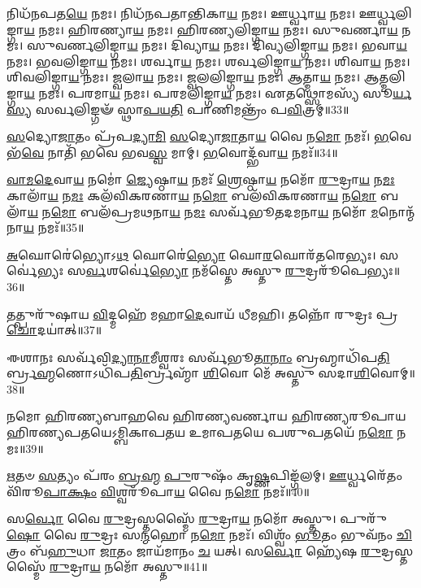𑌨𑌿𑌧᳴𑌨𑌪𑌤\-\ul{𑌯𑍇} 𑌨𑌮𑌃। 
𑌨𑌿𑌧᳴𑌨𑌪𑌤𑌾𑌨𑍍𑌤𑌿𑌕𑌾\-\ul{𑌯} 𑌨𑌮𑌃। 
𑌊𑌰𑍍𑌧𑍍𑌵𑌾\-\ul{𑌯} 𑌨𑌮𑌃। 
𑌊𑌰𑍍𑌧𑍍𑌵𑌲𑌿𑌙𑍍𑌗𑌾\-\ul{𑌯} 𑌨𑌮𑌃। 
𑌹𑌿𑌰𑌣𑍍𑌯𑌾\-\ul{𑌯} 𑌨𑌮𑌃। 
𑌹𑌿𑌰𑌣𑍍𑌯𑌲𑌿𑌙𑍍𑌗𑌾\-\ul{𑌯} 𑌨𑌮𑌃। 
𑌸𑍁𑌵𑌰𑍍𑌣𑌾\-\ul{𑌯} 𑌨𑌮𑌃। 
𑌸𑍁𑌵𑌰𑍍𑌣𑌲𑌿𑌙𑍍𑌗𑌾\-\ul{𑌯} 𑌨𑌮𑌃। 
𑌦𑌿𑌵𑍍𑌯𑌾\-\ul{𑌯} 𑌨𑌮𑌃। 
𑌦𑌿𑌵𑍍𑌯𑌲𑌿𑌙𑍍𑌗𑌾\-\ul{𑌯} 𑌨𑌮𑌃। 
𑌭𑌵𑌾\-\ul{𑌯} 𑌨𑌮𑌃। 
𑌭𑌵𑌲𑌿𑌙𑍍𑌗𑌾\-\ul{𑌯} 𑌨𑌮𑌃। 
𑌶𑌰𑍍𑌵𑌾\-\ul{𑌯} 𑌨𑌮𑌃। 
𑌶𑌰𑍍𑌵𑌲𑌿𑌙𑍍𑌗𑌾\-\ul{𑌯} 𑌨𑌮𑌃। 
𑌶𑌿𑌵𑌾\-\ul{𑌯} 𑌨𑌮𑌃। 
𑌶𑌿𑌵𑌲𑌿𑌙𑍍𑌗𑌾\-\ul{𑌯} 𑌨𑌮𑌃। 
𑌜𑍍𑌵𑌲𑌾\-\ul{𑌯} 𑌨𑌮𑌃। 
𑌜𑍍𑌵𑌲𑌲𑌿𑌙𑍍𑌗𑌾\-\ul{𑌯} 𑌨𑌮𑌃। 
𑌆𑌤𑍍𑌮𑌾\-\ul{𑌯} 𑌨𑌮𑌃। 
𑌆𑌤𑍍𑌮𑌲𑌿𑌙𑍍𑌗𑌾\-\ul{𑌯} 𑌨𑌮𑌃। 
𑌪𑌰𑌮𑌾\-\ul{𑌯} 𑌨𑌮𑌃। 
𑌪𑌰𑌮𑌲𑌿𑌙𑍍𑌗𑌾\-\ul{𑌯} 𑌨𑌮𑌃। 
𑌏𑌤𑌥𑍍𑌸𑍋𑌮𑌸𑍍𑌯᳴ 𑌸𑍂\-\ul{𑌰𑍍𑌯}\-\-\ul{𑌸𑍍𑌯} 𑌸𑌰𑍍𑌵𑌲𑌿𑌙𑍍𑌗𑍟᳴ 𑌸𑍍𑌥𑌾\-\ul{𑌪}\-\-\ul{𑌯}\-\-\ul{𑌤𑌿} 𑌪𑌾𑌣𑌿𑌮𑌨𑍍𑌤𑍍𑌰𑌂᳴ 𑌪\-\ul{𑌵𑌿}\-𑌤𑍍𑌰𑌮𑍍॥33॥
\anuvakamend

\-\ul{𑌸}\-𑌦𑍍𑌯𑍋\-\ul{𑌜𑌾}\-𑌤𑌂 𑌪𑍍𑌰᳴𑌪\-\ul{𑌦𑍍𑌯𑌾}\-\-\ul{𑌮𑌿} \ul{𑌸}\-𑌦𑍍𑌯𑍋\-\ul{𑌜𑌾}\-𑌤𑌾\-\ul{𑌯} 𑌵𑍈 𑌨\-\ul{𑌮𑍋} 𑌨𑌮𑌃᳴। 
\-\ul{𑌭}\-𑌵𑍇 𑌭᳴\-\ul{𑌵𑍇} 𑌨𑌾𑌤𑌿᳴ 𑌭𑌵𑍇 𑌭𑌵\-\ul{𑌸𑍍𑌵} 𑌮𑌾𑌮𑍍। 
\-\ul{𑌭}\-𑌵𑍋𑌦𑍍𑌭᳴𑌵𑌾\-\ul{𑌯} 𑌨𑌮𑌃᳴॥34॥
\anuvakamend

\-\ul{𑌵𑌾}\-\-\ul{𑌮}\-\-\ul{𑌦𑍇}\-𑌵𑌾\-\ul{𑌯} 𑌨𑌮𑍋॑ \ul{𑌜𑍍𑌯𑍇}\-𑌷𑍍𑌠𑌾\-\ul{𑌯} 𑌨𑌮𑌃᳴ \ul{𑌶𑍍𑌰𑍇}\-𑌷𑍍𑌠𑌾\-\ul{𑌯} 𑌨𑌮𑍋᳴ \ul{𑌰𑍁}\-𑌦𑍍𑌰𑌾\-\ul{𑌯} 𑌨\-\ul{𑌮𑌃} 𑌕𑌾𑌲𑌾᳴\-\ul{𑌯} 𑌨\-\ul{𑌮𑌃} 𑌕𑌲᳴𑌵𑌿𑌕𑌰𑌣𑌾\-\ul{𑌯} 𑌨\-\ul{𑌮𑍋} 𑌬𑌲᳴𑌵𑌿𑌕𑌰𑌣𑌾\-\ul{𑌯} 𑌨\-\ul{𑌮𑍋} 𑌬𑌲𑌾᳴\-\ul{𑌯} 𑌨\-\ul{𑌮𑍋} 𑌬𑌲᳴𑌪𑍍𑌰𑌮𑌥𑌨𑌾\-\ul{𑌯} 𑌨\-\ul{𑌮𑌃} 𑌸𑌰𑍍𑌵᳴𑌭𑍂𑌤𑌦𑌮𑌨𑌾\-\ul{𑌯} 𑌨𑌮𑍋᳴ \ul{𑌮}\-𑌨𑍋𑌨𑍍𑌮᳴𑌨𑌾\-\ul{𑌯} 𑌨𑌮𑌃᳴॥35॥\anuvakamend

\-\ul{𑌅}\-𑌘𑍋𑌰𑍇॑𑌭𑍍𑌯𑍋𑌽\-\ul{𑌥} 𑌘𑍋𑌰𑍇॑\-\ul{𑌭𑍍𑌯𑍋} 𑌘𑍋\-\ul{𑌰}\-𑌘𑍋𑌰᳴𑌤𑌰𑍇𑌭𑍍𑌯𑌃। 
𑌸𑌰𑍍𑌵𑍇॑𑌭𑍍𑌯𑌃 𑌸\-\ul{𑌰𑍍𑌵}\-𑌶𑌰𑍍𑌵𑍇॑\-\ul{𑌭𑍍𑌯𑍋} 𑌨𑌮᳴𑌸𑍍𑌤𑍇 𑌅𑌸𑍍𑌤𑍁 \ul{𑌰𑍁}\-𑌦𑍍𑌰𑌰𑍂᳴𑌪𑍇𑌭𑍍𑌯𑌃॥36॥
\anuvakamend

𑌤𑌤𑍍𑌪𑍁𑌰𑍁᳴𑌷𑌾𑌯 \ul{𑌵𑌿}\-𑌦𑍍𑌮𑌹𑍇᳴ 𑌮𑌹𑌾\-\ul{𑌦𑍇}\-𑌵𑌾𑌯᳴ 𑌧𑍀𑌮𑌹𑌿। 
𑌤𑌨𑍍𑌨𑍋᳴ 𑌰𑍁𑌦𑍍𑌰𑌃 𑌪𑍍𑌰\-\ul{𑌚𑍋}\-𑌦𑌯𑌾॑𑌤𑍍॥37॥
\anuvakamend

𑌈𑌶𑌾𑌨𑌃 𑌸𑌰𑍍𑌵᳴𑌵𑌿\-\ul{𑌦𑍍𑌯𑌾}\-\-\ul{𑌨𑌾}\-𑌮𑍀𑌶𑍍𑌵𑌰𑌃 𑌸𑌰𑍍𑌵᳴𑌭𑍂\-\ul{𑌤𑌾}\-\-\ul{𑌨𑌾𑌂} 𑌬𑍍𑌰𑌹𑍍𑌮𑌾𑌧𑌿᳴𑌪\-\ul{𑌤𑌿}\-𑌰𑍍𑌬𑍍𑌰\-\ul{𑌹𑍍𑌮}\-𑌣𑍋\-𑌽𑌧𑌿᳴𑌪\-\ul{𑌤𑌿}\-𑌰𑍍𑌬𑍍𑌰𑌹𑍍𑌮𑌾᳴ \ul{𑌶𑌿}\-𑌵𑍋 𑌮𑍇᳴ 𑌅𑌸𑍍𑌤𑍁 𑌸𑌦𑌾\-\ul{𑌶𑌿}\-𑌵𑍋𑌮𑍍॥38॥
\anuvakamend

𑌨𑌮𑍋 𑌹𑌿𑌰𑌣𑍍𑌯𑌬𑌾𑌹𑌵𑍇 𑌹𑌿𑌰𑌣𑍍𑌯𑌵𑌰𑍍𑌣𑌾𑌯 𑌹𑌿𑌰𑌣𑍍𑌯𑌰𑍂𑌪𑌾𑌯 𑌹𑌿𑌰𑌣𑍍𑌯𑌪𑌤𑌯𑍇\-𑌽𑌮𑍍𑌬𑌿𑌕𑌾𑌪𑌤𑌯 𑌉𑌮𑌾𑌪𑌤𑌯𑍇 𑌪𑌶𑍁𑌪𑌤𑌯𑍇᳴ 𑌨\-\ul{𑌮𑍋} 𑌨𑌮𑌃॥39॥
\anuvakamend

\-\ul{𑌋}\-𑌤𑍞 \ul{𑌸}\-𑌤𑍍𑌯𑌂 𑌪᳴𑌰𑌂 \ul{𑌬𑍍𑌰}\-\-\ul{𑌹𑍍𑌮} \ul{𑌪𑍁}\-𑌰𑍁𑌷𑌂᳴ 𑌕𑍃\-\ul{𑌷𑍍𑌣}\-𑌪𑌿𑌙𑍍𑌗᳴𑌲𑌮𑍍। 
\-\ul{𑌊}\-𑌰𑍍𑌧𑍍𑌵𑌰𑍇᳴𑌤𑌂 𑌵𑌿᳴𑌰𑍂\-\ul{𑌪𑌾}\-\-\ul{𑌕𑍍𑌷𑌂} \ul{𑌵𑌿}\-𑌶𑍍𑌵𑌰𑍂᳴𑌪𑌾\-\ul{𑌯} 𑌵𑍈 𑌨\-\ul{𑌮𑍋} 𑌨𑌮𑌃᳴॥40॥
\anuvakamend

𑌸\-\ul{𑌰𑍍𑌵𑍋} 𑌵𑍈 \ul{𑌰𑍁}\-𑌦𑍍𑌰𑌸𑍍𑌤𑌸𑍍𑌮𑍈᳴ \ul{𑌰𑍁}\-𑌦𑍍𑌰𑌾\-\ul{𑌯} 𑌨𑌮𑍋᳴ 𑌅𑌸𑍍𑌤𑍁। 
𑌪𑍁𑌰𑍁᳴\-\ul{𑌷𑍋} 𑌵𑍈 \ul{𑌰𑍁}\-𑌦𑍍𑌰𑌃 𑌸\-\ul{𑌨𑍍𑌮}\-𑌹𑍋 𑌨\-\ul{𑌮𑍋} 𑌨𑌮𑌃᳴। 
𑌵𑌿𑌶𑍍𑌵𑌂᳴ \ul{𑌭𑍂}\-𑌤𑌂 𑌭𑍁𑌵᳴𑌨𑌂 \ul{𑌚𑌿}\-𑌤𑍍𑌰𑌂 𑌬᳴\-\ul{𑌹𑍁}\-𑌧𑌾 \ul{𑌜𑌾}\-𑌤𑌂 𑌜𑌾𑌯᳴𑌮𑌾𑌨𑌂 \ul{𑌚} 𑌯𑌤𑍍। 
𑌸\-\ul{𑌰𑍍𑌵𑍋} 𑌹𑍍𑌯𑍇᳴𑌷 \ul{𑌰𑍁}\-𑌦𑍍𑌰𑌸𑍍𑌤𑌸𑍍𑌮𑍈᳴ \ul{𑌰𑍁}\-𑌦𑍍𑌰𑌾\-\ul{𑌯} 𑌨𑌮𑍋᳴ 𑌅𑌸𑍍𑌤𑍁॥41॥
\anuvakamend


